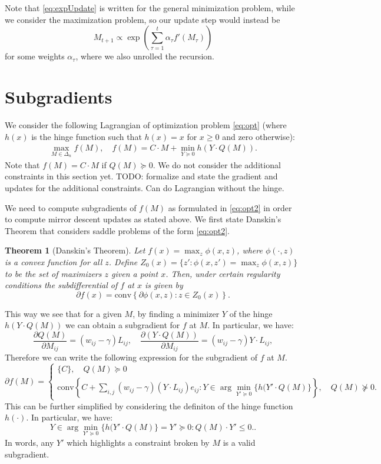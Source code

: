 \documentclass{article}
\newtheorem{theorem}{Theorem}[section]
\begin{document}
Note that \eqref{eq:expUpdate} is written for the general minimization problem, while we consider the maximization problem, so our update step would instead be
\[ M_{t+1} \propto \exp \left( \sum_{\tau=1}^t \alpha_\tau f'(M_\tau) \right) \]
for some weights $\alpha_\tau$, where we also unrolled the recursion.


\section{Subgradients}

We consider the following Lagrangian of optimization problem \eqref{eq:opt} (where $h(x)$ is the hinge function such that $h(x) = x$ for $x \geq 0$ and zero otherwise):
\begin{align}\label{eq:opt2}
  \max_{M \in \Delta_n} f(M),\quad f(M) =  C \cdot M + \min_{Y \succeq 0}  h(Y \cdot Q(M)).
\end{align}
Note that $f(M) = C \cdot M$ if $Q(M) \succeq 0$. We do not consider the additional constraints in this section yet. TODO: formalize and state the gradient and updates for the additional constraints. Can do Lagrangian without the hinge.


We need to compute subgradients of $f(M)$ as formulated in \eqref{eq:opt2} in order to compute mirror descent updates as stated above. We first state Danskin's Theorem \cite{danskin} that considers saddle problems of the form \eqref{eq:opt2}.

\begin{theorem}[Danskin's Theorem]
  Let $f(x) = \max_z \phi(x,z)$, where $\phi(\cdot,z)$ is a convex function for all $z$. Define $Z_0(x) = \{z' : \phi(x,z') = \max_z \phi(x,z)\}$ to be the set of maximizers $z$ given a point $x$. Then, under certain regularity conditions the subdifferential of $f$ at $x$ is given by
  \[ \partial f(x) = \mathrm{conv}\left\{ \partial \phi(x,z) : z \in Z_0(x)\right\}. \]
\end{theorem}

This way we see that for a given $M$, by finding a minimizer $Y$ of the hinge  $h(Y \cdot Q(M))$ we can obtain a subgradient for $f$ at $M$. In particular, we have:
\[ \frac{\partial Q(M)}{\partial M_{ij}} = (w_{ij} - \gamma) L_{ij}, \quad \frac{\partial (Y \cdot Q(M))}{\partial M_{ij}} = (w_{ij} - \gamma) Y \cdot L_{ij}, \]
Therefore we can write the following expression for the subgradient of $f$ at $M$.
\[ \partial f(M) = \begin{cases}
			\{C\}, \quad Q(M) \succeq 0 \\
			\mathrm{conv}\left\{C + \sum_{i,j} (w_{ij} - \gamma) \left(Y \cdot L_{ij} \right) e_{ij} :
			Y \in \arg\min_{Y' \succeq 0} \{h(Y' \cdot Q(M)\} \right\}, \quad Q(M) \not\succeq 0.
			\end{cases} \]
This can be further simplified by considering the definiton of the hinge function $h(\cdot).$
In particular, we have:
$$
Y \in \arg\min_{Y' \succeq 0} \{h(Y' \cdot Q(M)\} = {Y' \succeq 0 : Q(M) \cdot Y' \leq 0.}.
$$
In words, any $Y'$ which highlights a constraint broken by $M$ is a valid subgradient.
\end{document}
